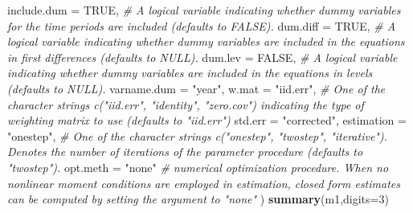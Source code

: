 \documentclass[
  12pt,
]{book}
\newenvironment{Shaded}{\begin{snugshade}}{\end{snugshade}}
\newcommand{\AttributeTok}[1]{\textcolor[rgb]{0.13,0.29,0.53}{#1}}
\newcommand{\CommentTok}[1]{\textcolor[rgb]{0.56,0.35,0.01}{\textit{#1}}}
\newcommand{\ConstantTok}[1]{\textcolor[rgb]{0.56,0.35,0.01}{#1}}
\newcommand{\DecValTok}[1]{\textcolor[rgb]{0.00,0.00,0.81}{#1}}
\newcommand{\FunctionTok}[1]{\textcolor[rgb]{0.13,0.29,0.53}{\textbf{#1}}}
\newcommand{\NormalTok}[1]{#1}
\newcommand{\StringTok}[1]{\textcolor[rgb]{0.31,0.60,0.02}{#1}}
\theoremstyle{definition}
\theoremstyle{definition}
\theoremstyle{definition}
\theoremstyle{definition}
\theoremstyle{remark}
\begin{document}
\begin{Shaded}
\begin{Highlighting}[]
             \AttributeTok{include.dum =} \ConstantTok{TRUE}\NormalTok{, }\CommentTok{\# A logical variable indicating whether dummy variables for the time periods are included (defaults to \textquotesingle{}FALSE\textquotesingle{}).}
             \AttributeTok{dum.diff =} \ConstantTok{TRUE}\NormalTok{, }\CommentTok{\# A logical variable indicating whether dummy variables are included in the equations in first differences (defaults to \textquotesingle{}NULL\textquotesingle{}).}
             \AttributeTok{dum.lev =} \ConstantTok{FALSE}\NormalTok{, }\CommentTok{\# A logical variable indicating whether dummy variables are included in the equations in levels (defaults to \textquotesingle{}NULL\textquotesingle{}).}
             \AttributeTok{varname.dum =} \StringTok{"year"}\NormalTok{,}
             \AttributeTok{w.mat =} \StringTok{"iid.err"}\NormalTok{, }\CommentTok{\# One of the character strings c(\textquotesingle{}"iid.err"\textquotesingle{}, \textquotesingle{}"identity"\textquotesingle{}, \textquotesingle{}"zero.cov"\textquotesingle{}) indicating the type of weighting matrix to use (defaults to \textquotesingle{}"iid.err"\textquotesingle{})}
             \AttributeTok{std.err =} \StringTok{"corrected"}\NormalTok{,}
             \AttributeTok{estimation =} \StringTok{"onestep"}\NormalTok{, }\CommentTok{\# One of the character strings c(\textquotesingle{}"onestep"\textquotesingle{}, \textquotesingle{}"twostep"\textquotesingle{}, \textquotesingle{}"iterative"\textquotesingle{}). Denotes the number of iterations of the parameter procedure (defaults to \textquotesingle{}"twostep"\textquotesingle{}).}
             \AttributeTok{opt.meth =} \StringTok{"none"} \CommentTok{\# numerical optimization procedure. When no nonlinear moment conditions are employed in estimation, closed form estimates can be computed by setting the argument to \textquotesingle{}"none"}
\NormalTok{)}
\FunctionTok{summary}\NormalTok{(m1,}\AttributeTok{digits=}\DecValTok{3}\NormalTok{)}
\end{Highlighting}
\end{Shaded}
\end{document}

